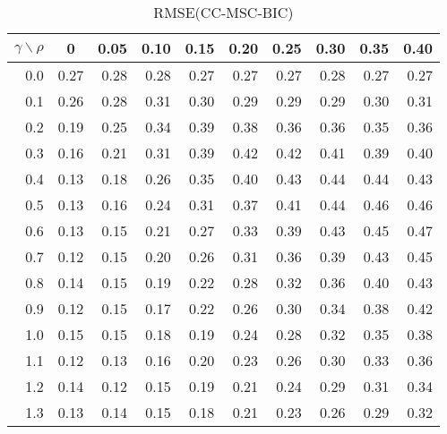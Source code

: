 \documentclass[12pt]{article}
\begin{document}
%
\begin{table}[!tbp]
\caption{RMSE(CC-MSC-BIC)}
 \begin{center}
 \begin{tabular}{r|rrrrrrrrr}\hline\hline
\multicolumn{1}{c|}{$\gamma\backslash\rho$}&\multicolumn{1}{c}{0}&\multicolumn{1}{c}{0.05}&\multicolumn{1}{c}{0.10}&\multicolumn{1}{c}{0.15}&\multicolumn{1}{c}{0.20}&\multicolumn{1}{c}{0.25}&\multicolumn{1}{c}{0.30}&\multicolumn{1}{c}{0.35}&\multicolumn{1}{c}{0.40}\tabularnewline
\hline
0.0&0.27&0.28&0.28&0.27&0.27&0.27&0.28&0.27&0.27\tabularnewline
0.1&0.26&0.28&0.31&0.30&0.29&0.29&0.29&0.30&0.31\tabularnewline
0.2&0.19&0.25&0.34&0.39&0.38&0.36&0.36&0.35&0.36\tabularnewline
0.3&0.16&0.21&0.31&0.39&0.42&0.42&0.41&0.39&0.40\tabularnewline
0.4&0.13&0.18&0.26&0.35&0.40&0.43&0.44&0.44&0.43\tabularnewline
0.5&0.13&0.16&0.24&0.31&0.37&0.41&0.44&0.46&0.46\tabularnewline
0.6&0.13&0.15&0.21&0.27&0.33&0.39&0.43&0.45&0.47\tabularnewline
0.7&0.12&0.15&0.20&0.26&0.31&0.36&0.39&0.43&0.45\tabularnewline
0.8&0.14&0.15&0.19&0.22&0.28&0.32&0.36&0.40&0.43\tabularnewline
0.9&0.12&0.15&0.17&0.22&0.26&0.30&0.34&0.38&0.42\tabularnewline
1.0&0.15&0.15&0.18&0.19&0.24&0.28&0.32&0.35&0.38\tabularnewline
1.1&0.12&0.13&0.16&0.20&0.23&0.26&0.30&0.33&0.36\tabularnewline
1.2&0.14&0.12&0.15&0.19&0.21&0.24&0.29&0.31&0.34\tabularnewline
1.3&0.13&0.14&0.15&0.18&0.21&0.23&0.26&0.29&0.32\tabularnewline
\hline
\end{tabular}

\end{center}

\end{table}
\end{document}
